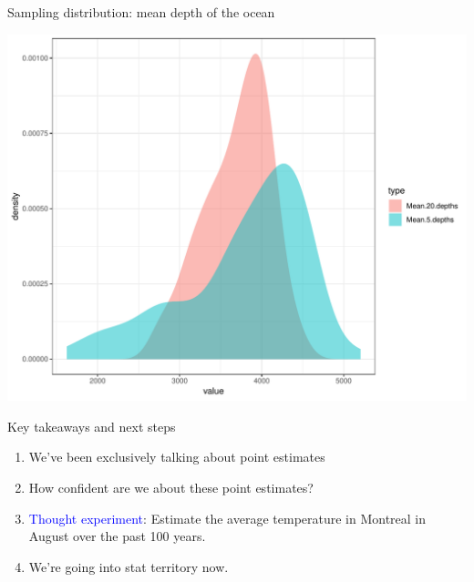 \documentclass{beamer}\usepackage[]{graphicx}\usepackage[]{color}
\newenvironment{knitrout}{}{} %
\begin{document}
\begin{frame}[fragile]{Sampling distribution: mean depth of the ocean}


\begin{knitrout}\scriptsize
{}\color{fgcolor}

{\centering \includegraphics[width=1\linewidth]{figure/unnamed-chunk-6-1} 

}



\end{knitrout}

\end{frame}
















\begin{frame}{Key takeaways and next steps}
\begin{enumerate}
	\setlength\itemsep{2em}
	\item We've been exclusively talking about point estimates \pause
	\item How confident are we about these point estimates? \pause
	\item \textcolor{blue}{Thought experiment}: Estimate the average temperature in Montreal in August over the past 100 years. \pause  
	\item We're going into stat territory now. 
\end{enumerate}
\end{frame}
\end{document}
